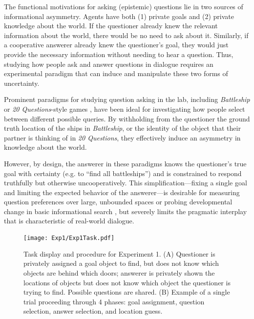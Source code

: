 \documentclass[12pt, floatsintext, jou]{apa6}
\begin{document}
The functional motivations for asking (epistemic) questions lie in two sources of informational asymmetry. 
Agents have both (1) private goals and (2) private knowledge about the world. 
If the questioner already knew the relevant information about the world, there would be no need to ask about it.
Similarly, if a cooperative answerer already knew the questioner's goal, they would just provide the necessary information without needing to hear a question.
Thus, studying how people ask and answer questions in dialogue requires an experimental paradigm that can induce and manipulate these two forms of uncertainty.

Prominent paradigms for studying question asking in the lab, including \emph{Battleship} \cite{RotheEtAl16_NaturalLanguageQuestions, rothe2018people} or \emph{20 Questions}-style games \cite{Siegler77_TwentyQuestions, cohen2016searching, NelsonDivjak___Meder14_GuessWho, RuggeriEtAl15_HierarchicalTwentyQs}, have been ideal for investigating how people select between different possible queries.
By withholding from the questioner the ground truth location of the ships in \emph{Battleship}, or the identity of the object that their partner is thinking of in \emph{20 Questions}, they effectively induce an asymmetry in knowledge about the world.

However, by design, the answerer in these paradigms knows the questioner's true goal with certainty (e.g. to ``find all battleships'') and is constrained to respond truthfully but otherwise uncooperatively.
This simplification---fixing a single goal and limiting the expected behavior of the answerer---is desirable for measuring question preferences over large, unbounded spaces \cite{cohen2016searching, rothe2017question} or probing developmental change in basic informational search \cite{RuggeriEtAl15_HierarchicalTwentyQs, ruggeri2016sources}, but severely limits the pragmatic interplay that is characteristic of real-world dialogue. 

\begin{figure}[t!]
\begin{center}
\texttt{[image: Exp1/Exp1Task.pdf]}
\end{center}
\caption{\footnotesize Task display and procedure for Experiment 1. (A) Questioner is privately assigned a goal object to find, but does not know which objects are behind which doors; answerer is privately shown the locations of objects but does not know which object the questioner is trying to find. Possible questions are shared. (B) Example of a single trial proceeding through 4 phases: goal assignment, question selection, answer selection, and location guess.}
\label{fig:expviews}
\end{figure}
\end{document}
